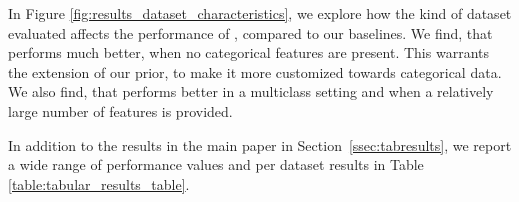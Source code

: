 \documentclass{article}
\begin{document}
In Figure \ref{fig:results_dataset_characteristics}, we explore how the kind of dataset evaluated affects the performance of \methodname{}, compared to our baselines. We find, that \methodname{} performs much better, when no categorical features are present. This warrants the extension of our prior, to make it more customized towards categorical data. We also find, that \methodname{} performs better in a multiclass setting and when a relatively large number of features is provided.

In addition to the results in the main paper in Section~\ref{ssec:tabresults}, we report a wide range of performance values and per dataset results in Table \ref{table:tabular_results_table}.

%     

\begin{table}[t]
    \caption{ROC AUC OVO results on the small \openmlcc{} for 60 minutes requested time per dataset and per split. If available, all baselines are given ROC AUC optimization as an objective, others optimize CE. Overall each method got a time budget of 150 hours, but not all methods used the full budget.}
    \centering
    \tiny
    
    \label{table:tabular_results_table}
\end{table}
\end{document}

